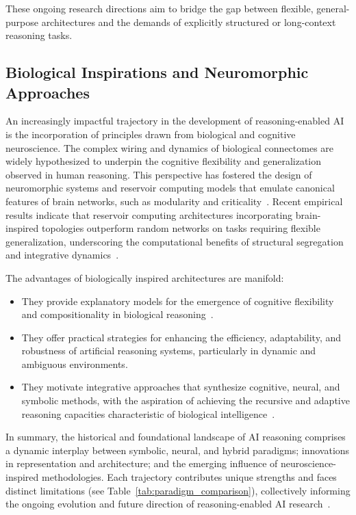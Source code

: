 These ongoing research directions aim to bridge the gap between flexible, general-purpose architectures and the demands of explicitly structured or long-context reasoning tasks.

\subsection{Biological Inspirations and Neuromorphic Approaches}

An increasingly impactful trajectory in the development of reasoning-enabled AI is the incorporation of principles drawn from biological and cognitive neuroscience. The complex wiring and dynamics of biological connectomes are widely hypothesized to underpin the cognitive flexibility and generalization observed in human reasoning. This perspective has fostered the design of neuromorphic systems and reservoir computing models that emulate canonical features of brain networks, such as modularity and criticality~\cite{ref90}. Recent empirical results indicate that reservoir computing architectures incorporating brain-inspired topologies outperform random networks on tasks requiring flexible generalization, underscoring the computational benefits of structural segregation and integrative dynamics~\cite{ref90}.

The advantages of biologically inspired architectures are manifold:

\begin{itemize}
    \item They provide explanatory models for the emergence of cognitive flexibility and compositionality in biological reasoning~\cite{ref90}.
    \item They offer practical strategies for enhancing the efficiency, adaptability, and robustness of artificial reasoning systems, particularly in dynamic and ambiguous environments.
    \item They motivate integrative approaches that synthesize cognitive, neural, and symbolic methods, with the aspiration of achieving the recursive and adaptive reasoning capacities characteristic of biological intelligence~\cite{ref49,ref90}.
\end{itemize}

In summary, the historical and foundational landscape of AI reasoning comprises a dynamic interplay between symbolic, neural, and hybrid paradigms; innovations in representation and architecture; and the emerging influence of neuroscience-inspired methodologies. Each trajectory contributes unique strengths and faces distinct limitations (see Table~\ref{tab:paradigm_comparison}), collectively informing the ongoing evolution and future direction of reasoning-enabled AI research~\cite{ref42,ref49,ref54,ref86,ref90,ref100}.

